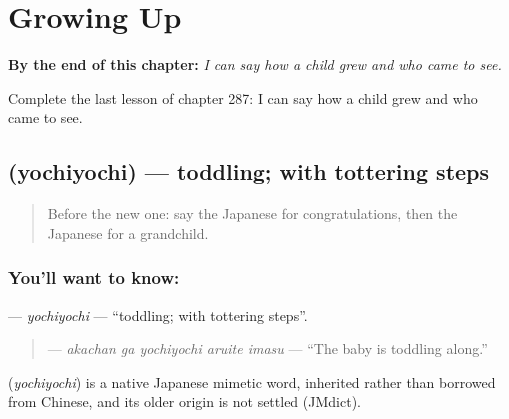 
\chapter{Growing Up}
\label{ch:ja-growing-up}

\begin{chapteropening}
\textbf{By the end of this chapter:} \emph{I can say how a child grew and who came to see.}

Complete the last lesson of chapter 287: I can say how a child grew and who came to see.
\end{chapteropening}

\section[\texorpdfstring{\ja{よちよち} (yochiyochi)}{よちよち (yochiyochi)}]{ (yochiyochi) — toddling; with tottering steps}

\label{lesson:JA-C287-yochiyochi}



\begin{quote}
Before the new one: say the Japanese for congratulations, then the Japanese for a grandchild.
\end{quote}

\subsection*{You'll want to know: }
\textbf{} — \emph{yochiyochi} — \textquotedblleft{}toddling; with tottering steps\textquotedblright{}.

\begin{quote}
\textbf{  } — \emph{akachan ga yochiyochi aruite imasu} — \textquotedblleft{}The baby is toddling along.\textquotedblright{}
\end{quote}

\begin{cousinweb}
\textbf{} (\emph{yochiyochi}) is a native Japanese mimetic word, inherited rather than borrowed from Chinese, and its older origin is not settled (JMdict).
\end{cousinweb}

